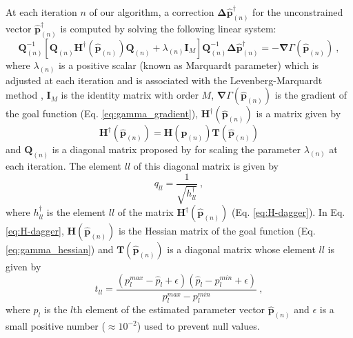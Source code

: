 At each iteration $n$ of our algorithm, a correction 
$\boldsymbol{\Delta}\hat{\mathbf{p}}^{\dagger}_{(n)}$ for the
unconstrained vector $\hat{\mathbf{p}}^{\dagger}_{(n)}$
is computed by solving the following linear system:
\begin{equation}\label{eq:linear-system}
\mathbf{Q}_{(n)}^{-1} \left[\mathbf{Q}_{(n)} \mathbf{H}^{\dagger}(\hat{\mathbf{p}}_{(n)}) \mathbf{Q}_{(n)} + \lambda_{(n)} \mathbf{I}_{M} \right] 
\mathbf{Q}_{(n)}^{-1} \boldsymbol{\Delta} \hat{\mathbf{p}}^{\dagger}_{(n)} 
= -\boldsymbol{\nabla}\Gamma(\hat{\mathbf{p}}_{(n)}) \: ,
\end{equation}
where $\lambda_{(n)}$ is a positive scalar (known as Marquardt parameter) which is adjusted at each iteration and is associated with the Levenberg-Marquardt method \cite[e.g., ][ p. 240]{silva-2001,aster-etal2019},
$\mathbf{I}_{M}$ is the identity matrix with order $M$, 
$\boldsymbol{\nabla}\Gamma(\hat{\mathbf{p}}_{(n)})$
is the gradient of the goal function (Eq. \ref{eq:gamma_gradient}), 
$\mathbf{H}^{\dagger}(\hat{\mathbf{p}}_{(n)})$ is a matrix given by
\begin{equation}\label{eq:H-dagger}
\mathbf{H}^{\dagger}(\hat{\mathbf{p}}_{(n)}) = \mathbf{H}(\hat{\mathbf{p}}_{(n)})\mathbf{T}(\hat{\mathbf{p}}_{(n)}) 
\end{equation}
and $\mathbf{Q}_{(n)}$ is a diagonal matrix proposed by \cite{marquardt_algorithm_1963} for scaling the parameter $\lambda_{(n)}$ 
at each iteration.
The element $ll$ of this diagonal matrix is given by
\begin{equation}\label{eq:Q-matrix}
q_{ll} = \frac{1}{\sqrt{h^{\dagger}_{ll}}} \: ,
\end{equation}
where $h^{\dagger}_{ll}$ is the element $ll$ of the matrix $\mathbf{H}^{\dagger}(\hat{\mathbf{p}}_{(n)})$ (Eq. \ref{eq:H-dagger}). 
In Eq. \ref{eq:H-dagger}, $\mathbf{H}(\hat{\mathbf{p}}_{(n)})$ is the Hessian matrix of the goal function (Eq. \ref{eq:gamma_hessian}) and $\mathbf{T}(\hat{\mathbf{p}}_{(n)})$ is a diagonal matrix whose element $ll$ is given by
\begin{equation}\label{eq:inequality-diag}
t_{ll} = \frac{(p_{l}^{max} - \hat{p}_{l} + \epsilon)(\hat{p}_{l} - p_{l}^{min} + \epsilon)}{p_{l}^{max} - p_{l}^{min}} \: ,
\end{equation}
where $\hat{p}_{l}$ is the $l$th element of the estimated parameter vector 
$\hat{\mathbf{p}}_{(n)}$ and $\epsilon$ is a small positive number 
($\approx 10^{-2}$) used to prevent null values.

